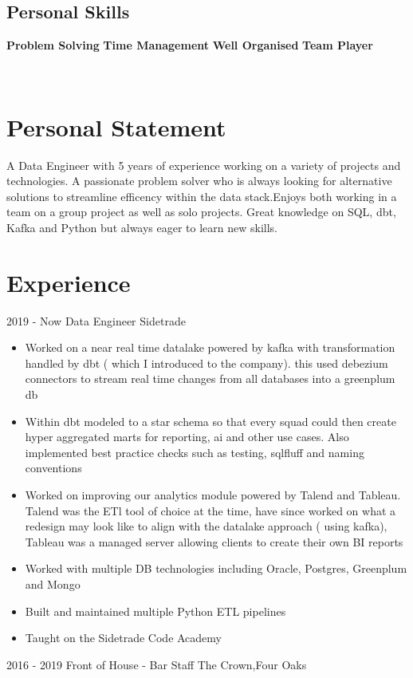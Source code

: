 \documentclass[]{friggeri-cv}
\begin{document}
\begin{aside}
  \section{Personal Skills}
    \textbf{Problem Solving}
    \textbf{Time Management}
    \textbf{Well Organised}
    \textbf{Team Player}    
    ~
\end{aside}
~
\section{Personal Statement}
A Data Engineer with 5 years of experience working on a variety of projects and technologies. A passionate problem solver who is always looking for alternative solutions to streamline efficency within the data stack.Enjoys both working in a team on a group project as well as solo projects. Great knowledge on SQL, dbt, Kafka and Python but always eager to learn new skills. 
\section{Experience}
\begin{entrylist}
  \entry
  {2019 - Now}
  {Data Engineer}
  {Sidetrade}
  {  
  \begin{itemize}
    \item Worked on a near real time datalake powered by kafka with transformation handled by dbt ( which I introduced to the company). this used debezium connectors to stream real time changes from all databases into a greenplum db
    \item Within dbt modeled to a star schema so that every squad could then create hyper aggregated marts for reporting, ai and other use cases. Also implemented best practice checks such as testing, sqlfluff and naming conventions
    \item Worked on improving our analytics module powered by Talend and Tableau. Talend was the ETl tool of choice at the time, have since worked on what a redesign may look like to align with the datalake approach ( using kafka), Tableau was a managed server allowing clients to create their own BI reports 
    \item Worked with multiple DB technologies including Oracle, Postgres, Greenplum and Mongo
    \item Built and maintained multiple Python ETL pipelines 
    \item Taught on the Sidetrade Code Academy 
  \end{itemize}}
  \entry
  {2016 - 2019}
  {Front of House - Bar Staff}
  {The Crown,Four Oaks}

\end{entrylist}
\end{document}
